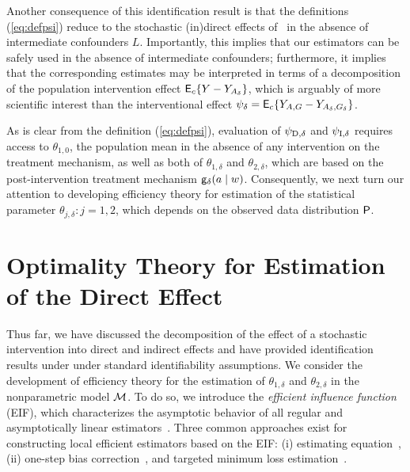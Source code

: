 Another consequence of this identification result is that the definitions
(\ref{eq:defpsi}) reduce to the stochastic (in)direct effects
of~\cite{diaz2020causal} in the absence of intermediate confounders $L$.
Importantly, this implies that our estimators can be safely used in the absence
of intermediate confounders; furthermore, it implies that the corresponding
estimates may be interpreted in terms of a decomposition of the population
intervention effect $\E_c\{Y - Y_{A_\delta}\}$, which is arguably of more
scientific interest than the interventional effect $\psi_\delta = \E_c\{Y_{A,G}
- Y_{A_\delta,G_\delta}\}$.

As is clear from the definition (\ref{eq:defpsi}), evaluation of $\psid$ and
$\psii$ requires access to $\theta_{1,0}$, the population mean in the absence of
any intervention on the treatment mechanism, as well as both of $\theta_{1,
\delta}$ and $\theta_{2,\delta}$, which are based on the post-intervention
treatment mechanism $\g_\delta(a \mid w)$. Consequently, we next turn our
attention to developing efficiency theory for estimation of the statistical
parameter $\theta_{j,\delta}: j = 1,2$, which depends on the observed data
distribution $\P$.

\section{Optimality Theory for Estimation of the Direct
  Effect}\label{sec:optimal}
Thus far, we have discussed the decomposition of the effect of a stochastic
intervention into direct and indirect effects and have provided identification
results under under standard identifiability assumptions. We consider the
development of efficiency theory for the estimation of $\theta_{1,\delta}$ and
$\theta_{2,\delta}$ in the nonparametric model $\M$. To do so, we introduce the
\textit{efficient influence function} (EIF), which characterizes the asymptotic
behavior of all regular and asymptotically linear
estimators~\citep{bickel1993efficient, vdvaart2002semiparametric}. Three common
approaches exist for constructing local efficient estimators based on the EIF:
(i) estimating equation~\citep[e.g.,][]{vdl2003unified}, (ii) one-step bias
correction~\citep[e.g.,][]{pfanzagl1985contributions, bickel1993efficient}, and
targeted minimum loss estimation~\citep{vdl2006targeted, vdl2011targeted,
vdl2018targeted}.

